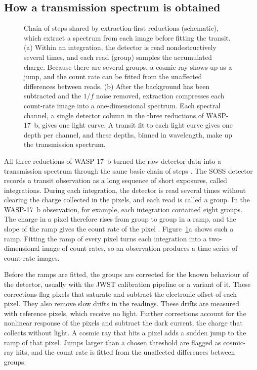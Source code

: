 \subsection{How a transmission spectrum is obtained}
\label{sec:detector-to-spectrum}

\begin{figure}[t]
  \centering
  
  \caption{Chain of steps shared by extraction-first reductions (schematic), which extract
  a spectrum from each image before fitting the transit. (a) Within an
  integration, the detector is read nondestructively several times, and each
  read (group) samples the accumulated charge. Because there are several groups, a cosmic ray shows up as a jump, and the count rate can be fitted from the unaffected differences between reads. (b) After the background has been
  subtracted and the $1/f$ noise removed, extraction compresses each
  count-rate image into a one-dimensional spectrum. Each spectral channel, a
  single detector column in the three reductions of WASP-17~b, gives one light
  curve. A transit fit to each light curve gives one depth per channel, and
  these depths, binned in wavelength, make up the transmission spectrum.}
  \label{fig:extraction-first-workflow}
\end{figure}

All three reductions of WASP-17~b turned the raw detector data into a
transmission spectrum through the same basic chain of steps
\citep{LouieEtAl2025}. The SOSS detector records a transit observation as a
long sequence of short exposures, called integrations. During each
integration, the detector is read several times without clearing the charge
collected in the pixels, and each read is called a group. In the WASP-17~b
observation, for example, each integration contained eight groups. The charge
in a pixel therefore rises from group to group in a ramp, and the slope of the
ramp gives the count rate of the pixel \citep{AlbertEtAl2023}.
Figure~\ref{fig:extraction-first-workflow}a shows such a ramp. Fitting the
ramp of every pixel turns each integration into a two-dimensional image of
count rates, so an observation produces a time series of count-rate images.

Before the ramps are fitted, the groups are corrected for the known behaviour
of the detector, usually with the JWST calibration pipeline
\citep{JWSTPipeline2025} or a variant of it. These corrections flag pixels
that saturate and subtract the electronic offset of each pixel. They also remove slow drifts in the readings. These drifts are measured with reference pixels, which receive no light. Further corrections account for the nonlinear response
of the pixels and subtract the dark current, the charge that collects without
light. A cosmic ray that hits a pixel adds a sudden jump to the ramp of that
pixel. Jumps larger than a chosen threshold are flagged as cosmic-ray hits,
and the count rate is fitted from the unaffected differences between groups.


